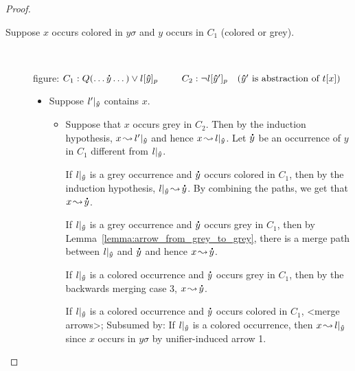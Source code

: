 \documentclass[,%
	paper=a4,%
	DIV9, %
	twoside=false,%
	liststotoc,
	bibtotoc,
	draft=false,%
	numbers=noendperiod
]{scrartcl}
\begin{document}
\begin{proof}
\begin{description}
\begin{itemize}
\begin{itemize}
\begin{itemize}
							\end{itemize}

					\end{itemize}



			\end{itemize}

		\item[Suppose $x$ occurs colored in $y\sigma$ and $y$ occurs in $C_1$ (colored or grey).]
			~

			figure:
			$C_1: Q(\dots \bdot y \dots) \lor l\occat{\bhat y}{p}\quad\quad$
			$C_2: \lnot l{[\bm\hat y']_{p}}\quad(\bm\hat y' \text{ is abstraction of } t[x])$


			\begin{itemize}
				\item Suppose $l'|_{\bm\hat y}$ contains $x$.
					\begin{itemize}
							\item
					Suppose that  $x$ occurs grey in $C_2$. Then by the induction hypothesis,
					$x\operatorname{\leadsto} l'|_{\bm\hat y}$ and hence 
					$x\operatorname{\leadsto} l|_{\bm\hat y}$. Let $\bm\dot y$ be an occurrence of $y$ in $C_1$ different from $l|_{\bm\hat y}$.

					If $l|_{\bm\hat y}$ is a grey occurrence and $\bm\dot y$ occurs colored in $C_1$, then by the induction hypothesis, $l|_{\bm\hat y} \operatorname{\leadsto} \bm\dot y$. By combining the paths, we get that $x\operatorname{\leadsto} \bm\dot y$.

					If $l|_{\bm\hat y}$ is a grey occurrence and $\bm\dot y$ occurs grey in $C_1$, then by Lemma~\ref{lemma:arrow_from_grey_to_grey}, there is a merge path between $l|_{\bm\hat y}$ and $\bm\dot y$ and hence $x\operatorname{\leadsto} \bm\dot y$.


					If $l|_{\bm\hat y}$ is a colored occurrence and $\bm\dot y$ occurs grey in $C_1$, then by the backwards merging case 3, $x\operatorname{\leadsto} \bm\dot y$.

					If $l|_{\bm\hat y}$ is a colored occurrence and $\bm\dot y$ occurs colored in $C_1$, <merge arrows>;
					Subsumed by:
					If $l|_{\bm\hat y}$ is a colored occurrence, then $x\operatorname{\leadsto} l|_{\bm\hat y}$ since $x$ occurs in $y\sigma$ by unifier-induced arrow 1.



\end{itemize}
\end{itemize}
\end{description}
\end{proof}
\end{document}
